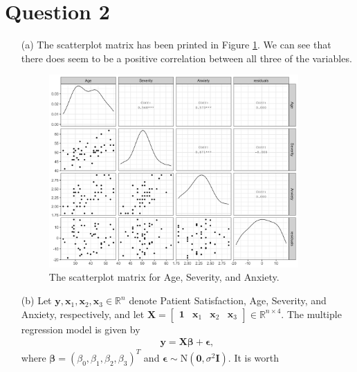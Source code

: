 \documentclass[10pt]{article}
\begin{document}
\section{Question 2} \noindent
\begin{itemize}
    \item[(a)] The scatterplot matrix has been printed in Figure \ref{ps-scatterplot}. We can see that there does seem to be a positive correlation between
    all three of the variables. 
    \begin{figure}
        \centering
        \includegraphics[width = 0.9\textwidth]{img/ps-correlation.png}
        \caption{The scatterplot matrix for {Age}, {Severity}, and {Anxiety}.}
        \label{ps-scatterplot}
    \end{figure}
    \item[(b)] Let \(\mathbf{y}, \mathbf{x}_1, \mathbf{x}_2, \mathbf{x}_3 \in \mathbb{R}^n\) denote {Patient Satisfaction}, {Age},
    {Severity}, and {Anxiety}, respectively, and let 
    \(\mathbf{X} = \begin{bmatrix}
        \mathbf{1} & \mathbf{x}_1 & \mathbf{x}_2 & \mathbf{x}_3
    \end{bmatrix} \in \mathbb{R}^{n \times 4}\).
    The multiple regression model is given by 
    \begin{align}
        \mathbf{y} =  \mathbf{X}\bm{\beta} + \bm{\epsilon},
        \label{ps-lm}
    \end{align}
    where \(\bm{\beta} = (\beta_0, \beta_1, \beta_2, \beta_3)^T\) and \(\bm{\epsilon} \sim \mathrm{N}(\mathbf{0}, \sigma^2 \mathbf{I})\). It is worth 

\end{itemize}
\end{document}
